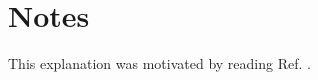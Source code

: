 \documentclass[12pt, a4paper]{article}
\begin{document}
	
	
	
	
	
	
	
	
	\section{Notes}
	This explanation was motivated by reading Ref. \cite{cormen2009algorithms_ch30}.
	
	
	

	
	
	

	
\end{document}
